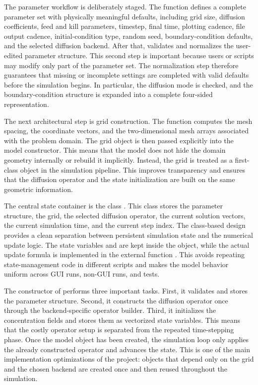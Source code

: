 The parameter workflow is deliberately staged. The function  defines a complete parameter set with physically meaningful defaults, including grid size, diffusion coefficients, feed and kill parameters, timestep, final time, plotting cadence, file output cadence, initial-condition type, random seed, boundary-condition defaults, and the selected diffusion backend. After that,  validates and normalizes the user-edited parameter structure. This second step is important because users or scripts may modify only part of the parameter set. The normalization step therefore guarantees that missing or incomplete settings are completed with valid defaults before the simulation begins. In particular, the diffusion mode is checked, and the boundary-condition structure is expanded into a complete four-sided representation.

The next architectural step is grid construction. The function  computes the mesh spacing, the coordinate vectors, and the two-dimensional mesh arrays associated with the problem domain. The grid object is then passed explicitly into the model constructor. This means that the model does not hide the domain geometry internally or rebuild it implicitly. Instead, the grid is treated as a first-class object in the simulation pipeline. This improves transparency and ensures that the diffusion operator and the state initialization are built on the same geometric information.

The central state container is the class . This class stores the parameter structure, the grid, the selected diffusion operator, the current solution vectors, the current simulation time, and the current step index. The class-based design provides a clean separation between persistent simulation state and the numerical update logic. The state variables  and  are kept inside the object, while the actual update formula is implemented in the external function . This avoids repeating state-management code in different scripts and makes the model behavior uniform across GUI runs, non-GUI runs, and tests.

The constructor of  performs three important tasks. First, it validates and stores the parameter structure. Second, it constructs the diffusion operator once through the backend-specific operator builder. Third, it initializes the concentration fields and stores them as vectorized state variables. This means that the costly operator setup is separated from the repeated time-stepping phase. Once the model object has been created, the simulation loop only applies the already constructed operator and advances the state. This is one of the main implementation optimizations of the project: objects that depend only on the grid and the chosen backend are created once and then reused throughout the simulation.


